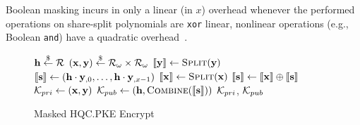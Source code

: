 Boolean masking incurs in only a linear (in $x$) overhead whenever the performed 
operations on share-split polynomials are \texttt{xor} linear, nonlinear operations (e.g., Boolean \texttt{and}) have a quadratic overhead~\cite{ishai2003private}.

\begin{figure}[!t]
\noindent\begin{minipage}{0.45\textwidth}
\footnotesize
    \begin{algorithm}[H]
        \caption{Masked HQC.PKE \textsf{Keygen}\label{alg:keygen}}

        $\mathbf{h}  \stackrel{\$}{\gets}  \mathcal{R}$\; 
        $(\mathbf{x},\mathbf{y})  \stackrel{\$}{\gets}  \mathcal{R}_\omega \times \mathcal{R}_\omega$\;
        $ \llbracket \mathbf{y} \rrbracket  \gets \text{\sc Split}(\mathbf{y})$\;
        $ \llbracket \mathbf{s} \rrbracket  \gets (\mathbf{h}\cdot\mathbf{y}_{,0},\ldots,\mathbf{h}\cdot\mathbf{y}_{,x-1})$\;
        $ \llbracket \mathbf{x} \rrbracket  \gets \text{\sc Split}(\mathbf{x})$\;
        $ \llbracket \mathbf{s} \rrbracket  \gets  \llbracket \mathbf{x} \rrbracket  \oplus  \llbracket \mathbf{s} \rrbracket $  \;
        $\mathcal{K}_{pri} \gets (\mathbf{x},\mathbf{y})$\;
        $\mathcal{K}_{pub} \gets (\mathbf{h},\textsc{Combine}( \llbracket \mathbf{s} \rrbracket ))$\;
        \KwRet $\mathcal{K}_{pri}$, $\mathcal{K}_{pub}$\;
        \BlankLine
        \BlankLine
        \BlankLine
        \BlankLine
        \BlankLine
        \BlankLine
        \BlankLine
        \BlankLine
        \BlankLine
        \BlankLine
        \BlankLine
    \end{algorithm}
\end{minipage}\hspace{0.5cm}
\begin{minipage}{0.5\textwidth}
\footnotesize
    \begin{algorithm}[H]
        \caption{Masked HQC.PKE \textsf{Encrypt}\label{alg:enc}}


\end{algorithm}
\end{minipage}
\end{figure}
